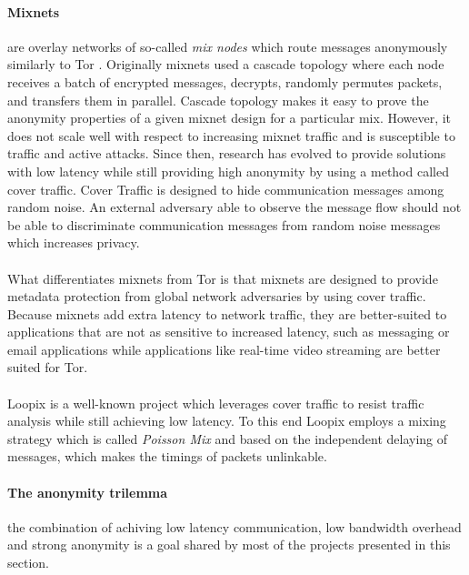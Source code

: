 \paragraph{Mixnets} are overlay networks of so-called \textit{mix nodes} which
route messages anonymously similarly to Tor \cite{mixnets}. Originally mixnets
used a cascade topology where each node receives a batch of encrypted messages,
decrypts, randomly permutes packets, and transfers them in parallel. Cascade
topology makes it easy to prove the anonymity properties of a given mixnet
design for a particular mix. However, it does not scale well with respect to
increasing mixnet traffic and is susceptible to traffic and active attacks.
Since then, research has evolved to provide solutions with low latency while
still providing high anonymity by using a method called cover traffic. Cover
Traffic is designed to hide communication messages among random noise. An
external adversary able to observe the message flow should not be able to
discriminate communication messages from random noise messages which increases
privacy.
\\~\\What differentiates mixnets from Tor is that mixnets are designed to provide
metadata protection from global network adversaries by using cover traffic.
Because mixnets add extra latency to network traffic, they are better-suited to
applications that are not as sensitive to increased latency, such as messaging
or email applications while applications like real-time video streaming are
better suited for Tor.
\\~\\Loopix \cite{loopix} is a well-known project which leverages cover traffic to
resist traffic analysis while still achieving low latency. To this end Loopix
employs a mixing strategy which is called \textit{Poisson Mix} and based on the
independent delaying of messages, which makes the timings of packets unlinkable.

\paragraph{The anonymity trilemma } \cite{AnonymityTrilemma} the combination of achiving low latency
communication, low bandwidth overhead and strong anonymity is a goal shared by
most of the projects presented in this section.

